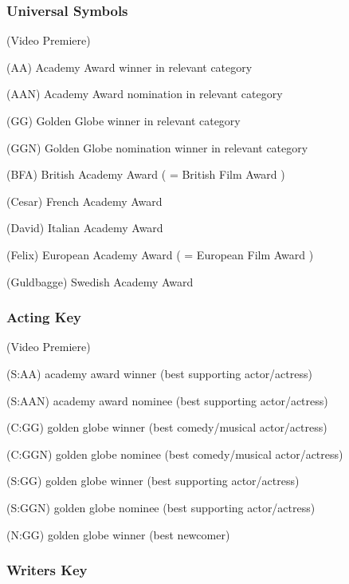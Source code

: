 \subsubsection{Universal Symbols}
\begin{Ventry}{(Video Premiere)}
\item[(AA)]   Academy Award winner in relevant category
\item[(AAN)]          Academy Award nomination in relevant category
\item[(GG)]           Golden Globe winner in relevant category
\item[(GGN)]            Golden Globe nomination winner in relevant category
\item[(BFA)]           British Academy Award ( = British Film Award )
\item[(Cesar)]        French Academy Award 
\item[(David)]         Italian Academy Award 
\item[(Felix)]         European Academy Award ( = European Film Award )
\item[(Guldbagge)]      Swedish Academy Award
\end{Ventry}

\subsubsection{Acting Key}
\begin{Ventry}{(Video Premiere)}
\item[(S:AA)]  academy award winner (best supporting actor/actress)
\item[(S:AAN)]         academy award nominee (best supporting actor/actress)
\item[(C:GG)]          golden globe winner (best comedy/musical actor/actress)
\item[(C:GGN)]         golden globe nominee (best comedy/musical actor/actress)
\item[(S:GG)]          golden globe winner (best supporting actor/actress)
\item[(S:GGN)]         golden globe nominee (best supporting actor/actress)
\item[(N:GG)]          golden globe winner (best newcomer)
\end{Ventry}

\subsubsection{Writers Key}

